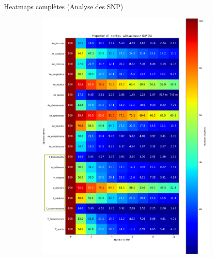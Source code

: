 \begin{frame}{Heatmaps complètes (Analyse des SNP)}
\begin{figure}[p]
\begin{subfigure}[b]{0.4\paperwidth}
            \includegraphics[width=\textwidth]{./Illustrations/Percent_Heatmap_SNP.png}
            \label{fig:PercentSNPHeatmap}
        \end{subfigure}
        
        \label{fig:SNPHeatmap}
    \end{figure}
\end{frame}

